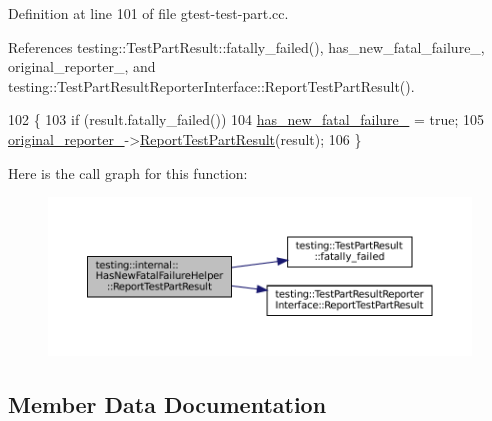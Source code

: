 Definition at line 101 of file gtest-\/test-\/part.\+cc.



References testing\+::\+Test\+Part\+Result\+::fatally\+\_\+failed(), has\+\_\+new\+\_\+fatal\+\_\+failure\+\_\+, original\+\_\+reporter\+\_\+, and testing\+::\+Test\+Part\+Result\+Reporter\+Interface\+::\+Report\+Test\+Part\+Result().


\begin{DoxyCode}
102                                   \{
103   \textcolor{keywordflow}{if} (result.fatally\_failed())
104     \hyperlink{classtesting_1_1internal_1_1HasNewFatalFailureHelper_a172103f6aefee8c387a44679888fee30}{has\_new\_fatal\_failure\_} = \textcolor{keyword}{true};
105   \hyperlink{classtesting_1_1internal_1_1HasNewFatalFailureHelper_a9f8be46b6aa39666e4a8557f240629e5}{original\_reporter\_}->\hyperlink{classtesting_1_1TestPartResultReporterInterface_aa2f920e7a5a0a6d0faf19e3727928c22}{ReportTestPartResult}(result);
106 \}
\end{DoxyCode}
Here is the call graph for this function\+:
\nopagebreak
\begin{figure}[H]
\begin{center}
\leavevmode
\includegraphics[width=350pt]{classtesting_1_1internal_1_1HasNewFatalFailureHelper_a2d2e1faa1f3669b82810df97ac678a27_cgraph}
\end{center}
\end{figure}


\subsection{Member Data Documentation}
\mbox{\label{classtesting_1_1internal_1_1HasNewFatalFailureHelper_a172103f6aefee8c387a44679888fee30}} 
